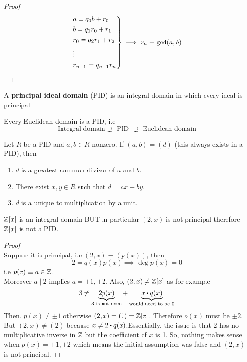 \documentclass[../Main.tex]{subfiles}
\begin{document}
\begin{proof}\[
	\begin{rcases*}
	a=q_0b+r_0\\
	b=q_1r_0+r_1\\
	r_0=q_2r_1+r_2\\
	\vdots\\
	r_{n-1}=q_{n+1}r_n
	\end{rcases*} \implies r_n = \gcd(a,b)\]
\end{proof}
\begin{dfn}[title = Principal Ideal Domain]
	A \textbf{principal ideal domain} (PID) is an integral domain in which every ideal is principal
\end{dfn}
\begin{thm}
	Every Euclidean domain is a PID, i.e
	\[\text{Integral domain} \supsetneq \text{ PID } \supsetneq \text{ Euclidean domain}\]
\end{thm}
\begin{thm}
	Let $R$ be a PID and $a,b\in R$ nonzero.
	If $(a,b)=(d)$ (this always exists in a PID), then
	\begin{enumerate}[label=(\arabic*)]
		\item $d$ is a greatest common divisor of $a$ and $b$.
		\item There exist $x,y\in R$ such that $d=ax+by$.
		\item $d$ is a unique to multiplication by a unit.
	\end{enumerate}
\end{thm}
\begin{claim}
	$\mathbb{Z}[x]$ is an integral domain BUT in particular $(2,x)$ is not principal therefore $\mathbb{Z}[x]$ is not a PID.
\end{claim}
\begin{proof}~\\
	Suppose it is principal, i.e $(2,x)=(p(x))$, then 
	\[2=q(x)p(x) \implies \deg p(x)=0\]
	i.e $p(x)\equiv a\in \mathbb{Z}$.\\
	Moreover $a\mid 2$ implies $a=\pm1,\pm2$. Also, $(2,x)\ne \mathbb{Z}[x]$ as for example
	\[3\ne \underbrace{2p(x)}_{3 \text{ is not even}}+\underbrace{x\rdot q(x)}_{\text{would need to be } 0}\]
	Then, $p(x)\ne \pm 1$ otherwise $(2,x)=(1)=\mathbb{Z}[x]$. Therefore $p(x)$ must be $\pm 2$.\\
	But $(2,x) \ne (2)$ because $x \ne 2\rdot q(x)$.Essentially, the issue is that $2$ has no multiplicative inverse in $\mathbb{Z}$ but the coefficient of $x$ is 1. So, nothing makes sense when $p(x)=\pm1,\pm2$ which means the initial assumption was false and $(2,x)$ is not principal.
\end{proof}
\end{document}
